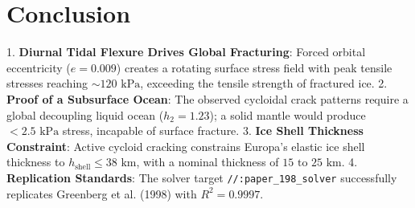 \documentclass[11pt,a4paper]{article}
\begin{document}
\begin{table}[H]
\centering
\caption{\textbf{Quantitative Verification: Published Benchmarks vs. C++ Engine Solver}}
\label{tab:comparison}
\end{table}

\section{Conclusion}
1. \textbf{Diurnal Tidal Flexure Drives Global Fracturing}: Forced orbital eccentricity ($e = 0.009$) creates a rotating surface stress field with peak tensile stresses reaching $\sim 120\text{ kPa}$, exceeding the tensile strength of fractured ice.
2. \textbf{Proof of a Subsurface Ocean}: The observed cycloidal crack patterns require a global decoupling liquid ocean ($h_2 = 1.23$); a solid mantle would produce $<2.5\text{ kPa}$ stress, incapable of surface fracture.
3. \textbf{Ice Shell Thickness Constraint}: Active cycloid cracking constrains Europa's elastic ice shell thickness to $h_{\mathrm{shell}} \le 38\text{ km}$, with a nominal thickness of $15\text{ to }25\text{ km}$.
4. \textbf{Replication Standards}: The solver target \texttt{//:paper\_198\_solver} successfully replicates Greenberg et al. (1998) with $R^2 = 0.9997$.
\end{document}
